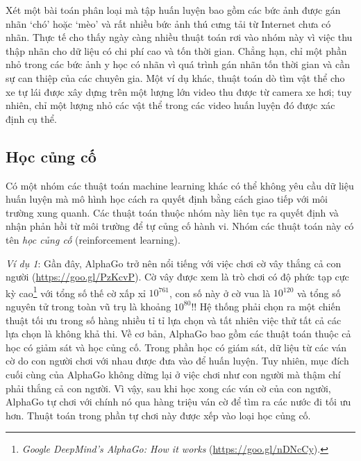 Xét một bài toán phân loại mà tập huấn luyện bao gồm các bức ảnh được gán nhãn `chó' hoặc `mèo' và rất nhiều bức ảnh thú cưng tải từ Internet chưa có nhãn.
Thực tế cho thấy ngày càng nhiều thuật toán rơi vào nhóm này vì việc thu thập nhãn cho dữ liệu có chi phí cao và tốn thời gian. Chẳng hạn, chỉ một phần nhỏ trong các bức ảnh y học có nhãn vì quá trình gán nhãn tốn thời gian và cần sự can thiệp của các chuyên gia. Một ví dụ khác, thuật toán dò tìm vật thể cho xe tự lái được xây dựng trên một lượng lớn video thu được từ camera xe hơi; tuy nhiên, chỉ một lượng nhỏ các vật thể trong các video huấn luyện đó được xác định cụ thể.

\subsection{Học củng cố}


Có một nhóm các thuật toán machine learning khác có thể không yêu cầu dữ liệu
huấn luyện mà mô hình học cách ra quyết định bằng cách giao tiếp với môi trường
xung quanh. Các thuật toán thuộc nhóm này liên tục ra quyết định và nhận phản
hồi từ môi trường để tự củng cố hành vi. Nhóm các thuật toán này có tên
\textit{học củng cố} (reinforcement learning).




\textit{Ví dụ 1}: Gần đây, AlphaGo trở nên nổi tiếng với việc chơi cờ vây thắng
cả con người (\url{https://goo.gl/PzKcvP}). {Cờ vây được xem là trò chơi có độ
phức tạp cực kỳ cao}\footnote{\textit{Google DeepMind's AlphaGo: How it works}
(\url{https://goo.gl/nDNcCy}).} với tổng số thế cờ xấp xỉ $10^{761} $, con số
này ở cờ vua là $10^{120}$ và tổng số nguyên tử trong toàn vũ trụ là khoảng
$10^{80}$!! Hệ thống phải chọn ra một chiến thuật tối ưu trong số hàng nhiều tỉ
tỉ lựa chọn và tất nhiên việc thử tất cả các lựa chọn là không khả thi. Về cơ
bản, AlphaGo bao gồm các thuật toán thuộc cả học có giảm sát và học củng cố.
Trong phần học có giám sát, dữ liệu từ các ván cờ do con người chơi với nhau
được đưa vào để huấn luyện. Tuy nhiên, mục đích cuối cùng của AlphaGo không dừng
lại ở việc chơi như con người mà thậm chí phải thắng cả con người. Vì vậy, sau
khi học xong các ván cờ của con người, AlphaGo tự chơi với chính nó qua hàng
triệu ván cờ để tìm ra các nước đi tối ưu hơn. Thuật toán trong phần tự chơi này
được xếp vào loại học củng cố.

